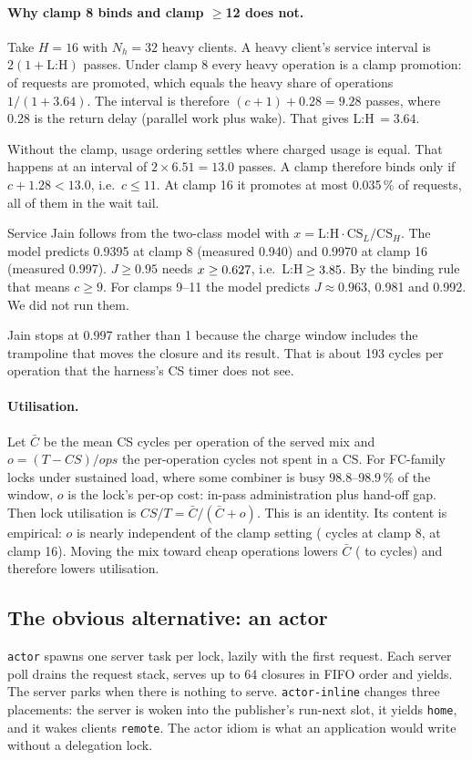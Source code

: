\documentclass[10pt,twocolumn]{article}
\newcommand{\lk}[1]{\texttt{#1}}
\begin{document}
\paragraph{Why clamp 8 binds and clamp $\ge$12 does not.}
Take $H{=}16$ with $N_h{=}32$ heavy clients. A heavy client's service interval
is $2(1+\text{L:H})$ passes. Under clamp 8 every heavy operation is a clamp
promotion: \PromotedCEight{} of requests are promoted, which equals the heavy
share of operations $1/(1+3.64)$. The interval is therefore $(c+1)+0.28=9.28$
passes, where 0.28 is the return delay (parallel work plus wake). That gives
L:H$\,=3.64$.

Without the clamp, usage ordering settles where charged usage is equal. That
happens at an interval of $2\times6.51=13.0$ passes. A clamp therefore binds
only if $c+1.28<13.0$, i.e.\ $c\le11$. At clamp 16 it promotes at most
0.035\,\% of requests, all of them in the wait tail.

Service Jain follows from the two-class model with
$x=\text{L:H}\cdot\text{CS}_L/\text{CS}_H$. The model predicts 0.9395 at clamp 8
(measured 0.940) and 0.9970 at clamp 16 (measured 0.997). $J\ge0.95$ needs
$x\ge0.627$, i.e.\ L:H\,$\ge3.85$. By the binding rule that
means $c\ge9$. For clamps 9--11 the model predicts $J\approx0.963$, 0.981 and
0.992. We did not run them.

Jain stops at 0.997 rather than 1 because the charge window includes the
trampoline that moves the closure and its result. That is about 193 cycles per
operation that the harness's CS timer does not see.

\paragraph{Utilisation.}
Let $\bar C$ be the mean CS cycles per operation of the served mix and
$o=(T-\mathit{CS})/\mathit{ops}$ the per-operation cycles not spent in a CS.
For FC-family locks under sustained load, where some combiner is busy
98.8--98.9\,\% of the window, $o$ is the lock's per-op cost:
in-pass administration plus hand-off gap. Then lock utilisation is
$\mathit{CS}/T=\bar C/(\bar C+o)$. This is an identity. Its content is
empirical: $o$ is nearly independent of the clamp setting (\OCEight{} cycles
at clamp 8, \OCSixteen{} at clamp 16). Moving the mix toward cheap operations
lowers $\bar C$ (\CbarCEight{} to \CbarCSixteen{} cycles) and therefore lowers
utilisation.

\subsection{The obvious alternative: an actor}
\lk{actor} spawns one server task per lock, lazily with the first request.
Each server poll drains the request stack, serves up to 64 closures in FIFO
order and yields. The server parks when there is nothing to serve.
\lk{actor-inline} changes three placements: the server is woken into the
publisher's run-next slot, it yields \lk{home}, and it wakes clients
\lk{remote}. The actor idiom is what an application would write without a
delegation lock.
\end{document}
